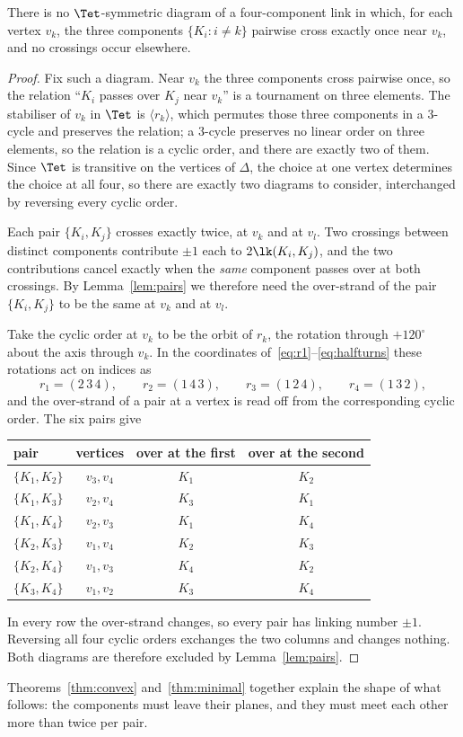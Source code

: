 \begin{theorem}\label{thm:minimal}
There is no $\Tet$-symmetric diagram of a four-component link in which, for each
vertex $v_k$, the three components $\{K_i:i\neq k\}$ pairwise cross exactly once
near $v_k$, and no crossings occur elsewhere.
\end{theorem}

\begin{proof}
Fix such a diagram. Near $v_k$ the three components cross pairwise once, so the
relation ``$K_i$ passes over $K_j$ near $v_k$'' is a tournament on three
elements. The stabiliser of $v_k$ in $\Tet$ is $\langle r_k\rangle$, which
permutes those three components in a $3$-cycle and preserves the relation; a
$3$-cycle preserves no linear order on three elements, so the relation is a
cyclic order, and there are exactly two of them. Since $\Tet$ is transitive on
the vertices of $\Delta$, the choice at one vertex determines the choice at all
four, so there are exactly two diagrams to consider, interchanged by reversing
every cyclic order.

Each pair $\{K_i,K_j\}$ crosses exactly twice, at $v_k$ and at $v_l$. Two
crossings between distinct components contribute $\pm1$ each to
$2\lk(K_i,K_j)$, and the two contributions cancel exactly when the \emph{same}
component passes over at both crossings. By Lemma~\ref{lem:pairs} we therefore
need the over-strand of the pair $\{K_i,K_j\}$ to be the same at $v_k$ and at
$v_l$.

Take the cyclic order at $v_k$ to be the orbit of $r_k$, the rotation through
$+120^\circ$ about the axis through $v_k$. In the coordinates
of~\eqref{eq:r1}--\eqref{eq:halfturns} these rotations act on indices as
\[
  r_1=(2\,3\,4),\qquad r_2=(1\,4\,3),\qquad r_3=(1\,2\,4),\qquad r_4=(1\,3\,2),
\]
and the over-strand of a pair at a vertex is read off from the corresponding
cyclic order. The six pairs give
\begin{center}\small
\begin{tabular}{@{}lccc@{}}
\toprule
pair & vertices & over at the first & over at the second\\
\midrule
$\{K_1,K_2\}$ & $v_3,v_4$ & $K_1$ & $K_2$\\
$\{K_1,K_3\}$ & $v_2,v_4$ & $K_3$ & $K_1$\\
$\{K_1,K_4\}$ & $v_2,v_3$ & $K_1$ & $K_4$\\
$\{K_2,K_3\}$ & $v_1,v_4$ & $K_2$ & $K_3$\\
$\{K_2,K_4\}$ & $v_1,v_3$ & $K_4$ & $K_2$\\
$\{K_3,K_4\}$ & $v_1,v_2$ & $K_3$ & $K_4$\\
\bottomrule
\end{tabular}
\end{center}
In every row the over-strand changes, so every pair has linking number $\pm1$.
Reversing all four cyclic orders exchanges the two columns and changes nothing.
Both diagrams are therefore excluded by Lemma~\ref{lem:pairs}.
\end{proof}

Theorems~\ref{thm:convex} and~\ref{thm:minimal} together explain the shape of
what follows: the components must leave their planes, and they must meet each
other more than twice per pair.


